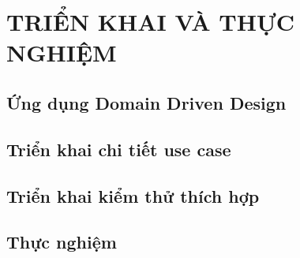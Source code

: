 \chapter{TRIỂN KHAI VÀ THỰC NGHIỆM}

\section{Ứng dụng Domain Driven Design}

\section{Triển khai chi tiết use case}

\section{Triển khai kiểm thử thích hợp}

\section{Thực nghiệm}
